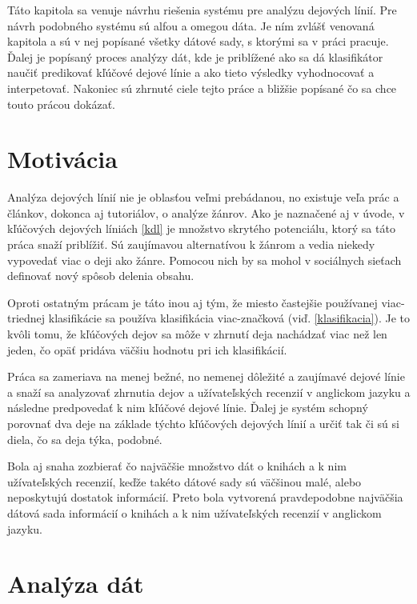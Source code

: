 Táto kapitola sa venuje návrhu riešenia systému pre analýzu dejových línií. Pre návrh podobného systému sú alfou a omegou dáta. Je ním zvlášť venovaná kapitola a sú v nej popísané všetky dátové sady, s ktorými sa v práci pracuje. Ďalej je popísaný proces analýzy dát, kde je priblížené ako sa dá klasifikátor naučiť predikovať kľúčové dejové línie a ako tieto výsledky vyhodnocovať a interpetovať. Nakoniec sú zhrnuté ciele tejto práce a bližšie popísané čo sa chce touto prácou dokázať. 

\section{Motivácia}

Analýza dejových línií nie je oblasťou veľmi prebádanou, no existuje veľa prác a článkov, dokonca aj tutoriálov, o analýze žánrov. Ako je naznačené aj v úvode, v kľúčových dejových líniách \ref{kdl} je množstvo skrytého potenciálu, ktorý sa táto práca snaží priblížiť. Sú zaujímavou alternatívou k žánrom a vedia niekedy vypovedať viac o deji ako žánre. Pomocou nich by sa mohol v sociálnych sieťach definovať nový spôsob delenia obsahu. 

Oproti ostatným prácam je táto inou aj tým, že miesto častejšie používanej viac-triednej klasifikácie sa používa klasifikácia viac-značková (viď. \ref{klasifikacia}). Je to kvôli tomu, že kľúčových dejov sa môže v zhrnutí deja nachádzať viac než len jeden, čo opäť pridáva väčšiu hodnotu pri ich klasifikácií.

Práca sa zameriava na menej bežné, no nemenej dôležité a zaujímavé dejové línie a snaží sa analyzovať zhrnutia dejov a užívateľských recenzií v anglickom jazyku a následne predpovedať k nim kľúčové dejové línie. Ďalej je systém schopný porovnať dva deje na základe týchto kľúčových dejových línií a určiť tak či sú si diela, čo sa deja týka, podobné.

Bola aj snaha zozbierať čo najväčšie množstvo dát o knihách a k nim užívateľských recenzií, keďže takéto dátové sady sú väčšinou malé, alebo neposkytujú dostatok informácií. Preto bola vytvorená pravdepodobne najväčšia dátová sada informácií o knihách a k nim užívateľských recenzií v anglickom jazyku.

\section{Analýza dát}

